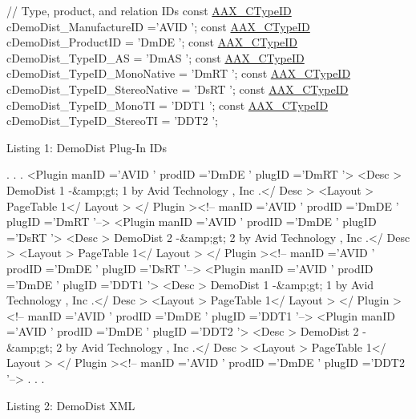 \begin{DoxyCode}
\textcolor{comment}{// Type, product, and relation IDs}
\textcolor{keyword}{const} \hyperlink{a00149_ac678f9c1fbcc26315d209f71a147a175}{AAX\_CTypeID} cDemoDist\_ManufactureID =\textcolor{stringliteral}{'AVID '};
\textcolor{keyword}{const} \hyperlink{a00149_ac678f9c1fbcc26315d209f71a147a175}{AAX\_CTypeID} cDemoDist\_ProductID = \textcolor{stringliteral}{'DmDE '};
\textcolor{keyword}{const} \hyperlink{a00149_ac678f9c1fbcc26315d209f71a147a175}{AAX\_CTypeID} cDemoDist\_TypeID\_AS = \textcolor{stringliteral}{'DmAS '};
\textcolor{keyword}{const} \hyperlink{a00149_ac678f9c1fbcc26315d209f71a147a175}{AAX\_CTypeID} cDemoDist\_TypeID\_MonoNative = \textcolor{stringliteral}{'DmRT '};
\textcolor{keyword}{const} \hyperlink{a00149_ac678f9c1fbcc26315d209f71a147a175}{AAX\_CTypeID} cDemoDist\_TypeID\_StereoNative = \textcolor{stringliteral}{'DsRT '};
\textcolor{keyword}{const} \hyperlink{a00149_ac678f9c1fbcc26315d209f71a147a175}{AAX\_CTypeID} cDemoDist\_TypeID\_MonoTI = \textcolor{stringliteral}{'DDT1 '};
\textcolor{keyword}{const} \hyperlink{a00149_ac678f9c1fbcc26315d209f71a147a175}{AAX\_CTypeID} cDemoDist\_TypeID\_StereoTI = \textcolor{stringliteral}{'DDT2 '}; 
\end{DoxyCode}
  Listing 1\+: Demo\+Dist Plug-\/\+In I\+Ds


\begin{DoxyCode}
.
.
.
<Plugin manID =\textcolor{stringliteral}{'AVID '} prodID =\textcolor{stringliteral}{'DmDE '} plugID =\textcolor{stringliteral}{'DmRT '}>
<Desc > DemoDist 1 -&amp;gt; 1 by Avid Technology , Inc .</ Desc >
<Layout > PageTable 1</ Layout >
</ Plugin ><!-- manID =\textcolor{stringliteral}{'AVID '} prodID =\textcolor{stringliteral}{'DmDE '} plugID =\textcolor{stringliteral}{'DmRT '}-->
<Plugin manID =\textcolor{stringliteral}{'AVID '} prodID =\textcolor{stringliteral}{'DmDE '} plugID =\textcolor{stringliteral}{'DsRT '}>
<Desc > DemoDist 2 -&amp;gt; 2 by Avid Technology , Inc .</ Desc >
<Layout > PageTable 1</ Layout >
</ Plugin ><!-- manID =\textcolor{stringliteral}{'AVID '} prodID =\textcolor{stringliteral}{'DmDE '} plugID =\textcolor{stringliteral}{'DsRT '}-->
<Plugin manID =\textcolor{stringliteral}{'AVID '} prodID =\textcolor{stringliteral}{'DmDE '} plugID =\textcolor{stringliteral}{'DDT1 '}>
<Desc > DemoDist 1 -&amp;gt; 1 by Avid Technology , Inc .</ Desc >
<Layout > PageTable 1</ Layout >
</ Plugin ><!-- manID =\textcolor{stringliteral}{'AVID '} prodID =\textcolor{stringliteral}{'DmDE '} plugID =\textcolor{stringliteral}{'DDT1 '}-->
<Plugin manID =\textcolor{stringliteral}{'AVID '} prodID =\textcolor{stringliteral}{'DmDE '} plugID =\textcolor{stringliteral}{'DDT2 '}>
<Desc > DemoDist 2 -&amp;gt; 2 by Avid Technology , Inc .</ Desc >
<Layout > PageTable 1</ Layout >
</ Plugin ><!-- manID =\textcolor{stringliteral}{'AVID '} prodID =\textcolor{stringliteral}{'DmDE '} plugID =\textcolor{stringliteral}{'DDT2 '}-->
.
.
. 
\end{DoxyCode}
  Listing 2\+: Demo\+Dist X\+M\+L

